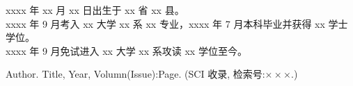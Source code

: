 \noindent xxxx 年 xx 月 xx 日出生于 xx 省 xx 县。\\
\noindent xxxx 年 9 月考入 xx 大学 xx 系 xx 专业，xxxx 年 7 月本科毕业并获得 xx 学士学位。\\
\noindent xxxx 年 9 月免试进入 xx 大学 xx 系攻读 xx 学位至今。

\begin{enumerate}[{[}1{]}]
\item Author. Title, Year,
  Volumn(Issue):Page. (SCI 收录, 检索号:$\times\times\times$.)

\end{enumerate}

\begin{enumerate}[{[}1{]}]
\item 
\end{enumerate}
